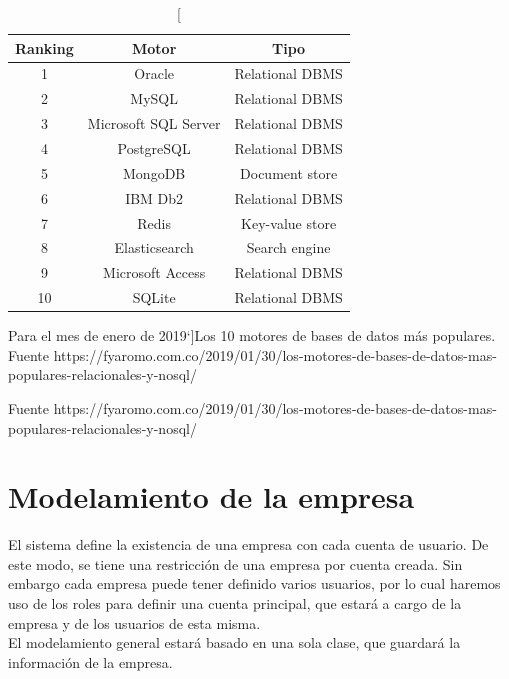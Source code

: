 \begin{table}[htdp]
\centering
\begin{tabular}{||c | c | c ||}
\hline
\hline
\textbf{Ranking} & \textbf{Motor} & \textbf{Tipo} \\
\hline
\hline
1 & Oracle & Relational DBMS \\
\hline
\hline
2 & MySQL & Relational DBMS \\
\hline
\hline
3 & Microsoft SQL Server & Relational DBMS \\
\hline
\hline
4 & PostgreSQL & Relational DBMS \\
\hline
\hline
5 & MongoDB & Document store \\
\hline
\hline
6 & IBM Db2 & Relational DBMS \\
\hline
\hline
7 & Redis & Key-value store \\
\hline
\hline
8 & Elasticsearch & Search engine \\
\hline
\hline
9 & Microsoft Access & Relational DBMS \\
\hline
\hline
10 & SQLite & Relational DBMS \\
\hline
\hline
\end{tabular}
\caption[Para el mes de enero de 2019`]{Los 10 motores de bases de datos más populares. \\ Fuente https://fyaromo.com.co/2019/01/30/los-motores-de-bases-de-datos-mas-populares-relacionales-y-nosql/}
\label{tab:tabla} 
\end{table}
Fuente https://fyaromo.com.co/2019/01/30/los-motores-de-bases-de-datos-mas-populares-relacionales-y-nosql/

\section{Modelamiento de la empresa}

El sistema define la existencia de una empresa con cada cuenta de usuario. De este modo, se tiene una restricción de una empresa por cuenta creada. Sin embargo cada empresa puede tener definido varios usuarios, por lo cual haremos uso de los roles para definir una cuenta principal, que estará a cargo de la empresa y de los usuarios de esta misma.\\

El modelamiento general estará basado en una sola clase, que guardará la información de la empresa.\\

